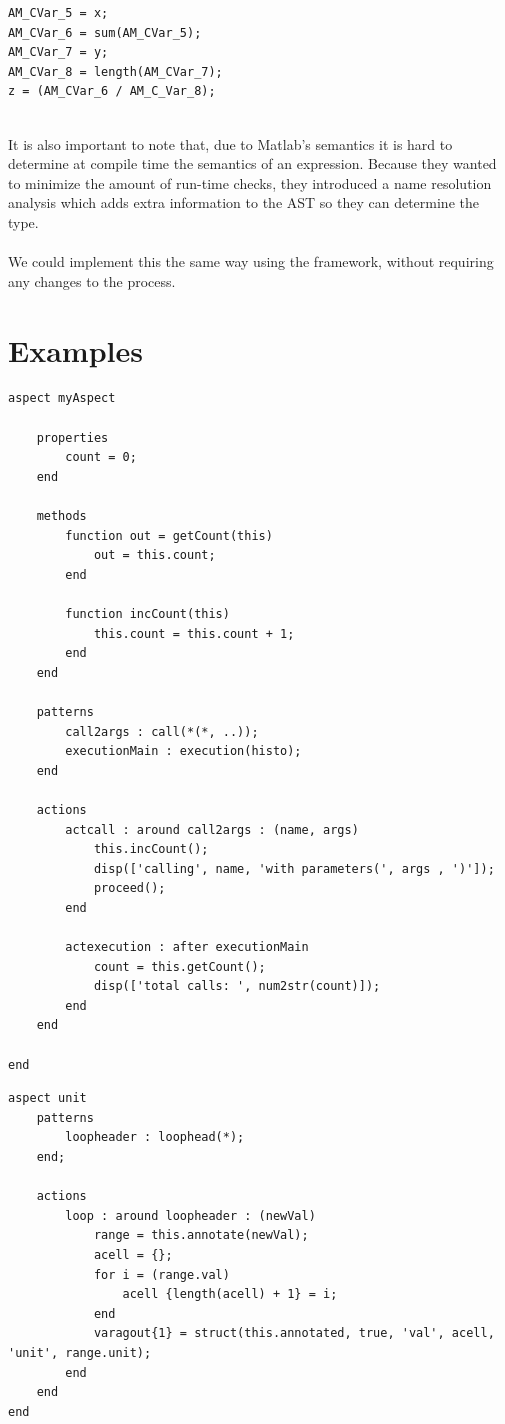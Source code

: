 \documentclass[a4paper]{report}
\begin{document}
\begin{minipage}{0.45\textwidth}
\begin{lstlisting}[caption=Resulting code.]
AM_CVar_5 = x;
AM_CVar_6 = sum(AM_CVar_5);
AM_CVar_7 = y;
AM_CVar_8 = length(AM_CVar_7);
z = (AM_CVar_6 / AM_C_Var_8);
\end{lstlisting}
\end{minipage}
\\
It is also important to note that, due to Matlab's semantics it is hard to determine at compile time the semantics of an expression. Because they wanted to minimize the amount of run-time checks, they introduced a name resolution analysis which adds extra information to the AST so they can determine the type.\\
\\
We could implement this the same way using the framework, without requiring any changes to the process.

\section{Examples}
\begin{lstlisting}[caption=An aspect to count all calls made with at least 2 arguments., label=lst:Matlab_ExampleCalls]
aspect myAspect

	properties
		count = 0;
	end

	methods
		function out = getCount(this)
			out = this.count;
		end

		function incCount(this)
			this.count = this.count + 1;
		end
	end

	patterns
		call2args : call(*(*, ..));
		executionMain : execution(histo);
	end

	actions
		actcall : around call2args : (name, args)
			this.incCount();
			disp(['calling', name, 'with parameters(', args , ')']);
			proceed();
		end
		
		actexecution : after executionMain
			count = this.getCount();
			disp(['total calls: ', num2str(count)]);
		end
	end

end
\end{lstlisting}
\begin{lstlisting}[caption=Example of a units aspect., label=Matlab_ExampleUnits]
aspect unit
	patterns
		loopheader : loophead(*);
	end;
	
	actions
		loop : around loopheader : (newVal)
			range = this.annotate(newVal);
			acell = {};
			for i = (range.val)
				acell {length(acell) + 1} = i;
			end
			varagout{1} = struct(this.annotated, true, 'val', acell, 'unit', range.unit);
		end
	end
end
\end{lstlisting}
\end{document}
